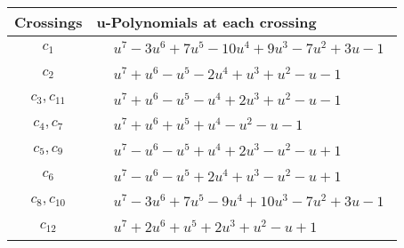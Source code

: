 \documentclass[1p]{elsarticle_modified}
\theoremstyle{definition}
\begin{document}
\begin{tabular}{m{50pt}|m{274pt}}
Crossings & \hspace{64pt}u-Polynomials at each crossing \\
\hline $$\begin{aligned}c_{1}\end{aligned}$$&$\begin{aligned}
&u^7-3 u^6+7 u^5-10 u^4+9 u^3-7 u^2+3 u-1
\end{aligned}$\\
\hline $$\begin{aligned}c_{2}\end{aligned}$$&$\begin{aligned}
&u^7+u^6- u^5-2 u^4+u^3+u^2- u-1
\end{aligned}$\\
\hline $$\begin{aligned}c_{3},c_{11}\end{aligned}$$&$\begin{aligned}
&u^7+u^6- u^5- u^4+2 u^3+u^2- u-1
\end{aligned}$\\
\hline $$\begin{aligned}c_{4},c_{7}\end{aligned}$$&$\begin{aligned}
&u^7+u^6+u^5+u^4- u^2- u-1
\end{aligned}$\\
\hline $$\begin{aligned}c_{5},c_{9}\end{aligned}$$&$\begin{aligned}
&u^7- u^6- u^5+u^4+2 u^3- u^2- u+1
\end{aligned}$\\
\hline $$\begin{aligned}c_{6}\end{aligned}$$&$\begin{aligned}
&u^7- u^6- u^5+2 u^4+u^3- u^2- u+1
\end{aligned}$\\
\hline $$\begin{aligned}c_{8},c_{10}\end{aligned}$$&$\begin{aligned}
&u^7-3 u^6+7 u^5-9 u^4+10 u^3-7 u^2+3 u-1
\end{aligned}$\\
\hline $$\begin{aligned}c_{12}\end{aligned}$$&$\begin{aligned}
&u^7+2 u^6+u^5+2 u^3+u^2- u+1
\end{aligned}$\\
\hline
\end{tabular}\\~\\
\end{document}
